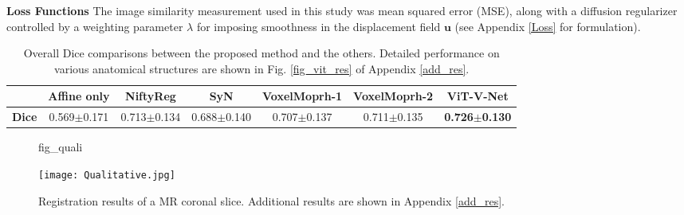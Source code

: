 \documentclass{midl}
\begin{document}
\noindent\textbf{Loss Functions} 
The image similarity measurement used in this study was mean squared error (MSE), along with a diffusion regularizer controlled by a weighting parameter $\lambda$ for imposing smoothness in the displacement field $\mathbf{u}$ (see Appendix \ref{Loss} for formulation).

\begin{table}[h]
\vspace{-1mm}
\centering
\scriptsize
    \begin{tabular}{ c | c c c c c c}
 \hline
 & Affine only & NiftyReg & SyN & VoxelMoprh-1 & VoxelMoprh-2 & ViT-V-Net\\
 \hline
 \textbf{Dice} & 0.569$\pm$0.171 & 0.713$\pm$0.134 & 0.688$\pm$0.140 & 0.707$\pm$0.137 & 0.711$\pm$0.135 & \textbf{0.726$\pm$0.130}\\
 
 \hline
\end{tabular}
\captionsetup{justification=centering}
\caption{Overall Dice comparisons between the proposed method and the others. Detailed performance on various anatomical structures are shown in Fig. \ref{fig_vit_res} of Appendix \ref{add_res}.}\label{table_r}
\end{table}
\vspace{-8mm}

\begin{figure}[t]
\floatconts
{fig_quali}
  {\caption{Registration results of a MR coronal slice. Additional results are shown in Appendix \ref{add_res}.}}
  {\texttt{[image: Qualitative.jpg]}\vspace{-4mm}}
\vspace{-4mm}
\end{figure}
\end{document}

